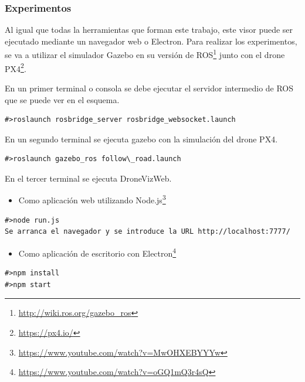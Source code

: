 \subsubsection{Experimentos}
Al igual que todas la herramientas que forman este trabajo, este visor puede ser ejecutado mediante un navegador web o Electron. Para realizar los experimentos, se va a utilizar el simulador Gazebo en su versión de ROS\footnote{\url{http://wiki.ros.org/gazebo_ros}} junto con el drone PX4\footnote{\url{https://px4.io/}}.

En un primer terminal o consola se debe ejecutar el servidor intermedio de ROS que se puede ver en el esquema.
\begin{lstlisting}[caption= Ejecución del servidor intermedio, label=cod.servidorintermediodrone]
#>roslaunch rosbridge_server rosbridge_websocket.launch
\end{lstlisting}

En un segundo terminal se ejecuta gazebo con la simulación del drone PX4.

\begin{lstlisting}[caption= Ejecución de gazebo con el drone PX4 label=cod.gazebodrone]
#>roslaunch gazebo_ros follow\_road.launch
\end{lstlisting}

En el tercer terminal se ejecuta DroneVizWeb.

\begin{itemize}
\item Como aplicación web utilizando Node.js\footnote{\url{https://www.youtube.com/watch?v=MwOHXEBYYYw}}
\end{itemize}
\begin{lstlisting}[caption= Ejecución con Node.js, label=cod.dronenodejs]
#>node run.js
Se arranca el navegador y se introduce la URL http://localhost:7777/
\end{lstlisting}
\begin{itemize}
\item Como aplicación de escritorio con Electron\footnote{\url{https://www.youtube.com/watch?v=oGQ1mQ3r4sQ}}
\end{itemize}
\begin{lstlisting}[caption= Ejecución con Electron, label=cod.droneelectron]
#>npm install
#>npm start
\end{lstlisting}


